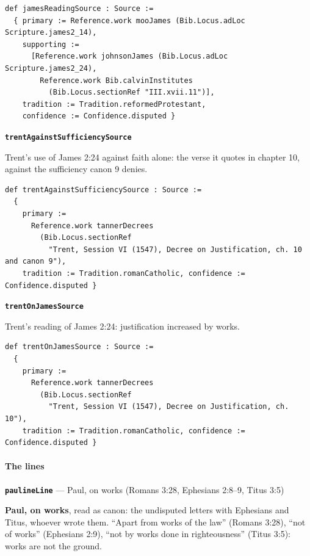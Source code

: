 \documentclass[11pt,paper=\testimonypaper,DIV=13,parskip=false]{scrartcl}
\begin{document}
{\small\begin{verbatim}
def jamesReadingSource : Source :=
  { primary := Reference.work mooJames (Bib.Locus.adLoc Scripture.james2_14),
    supporting :=
      [Reference.work johnsonJames (Bib.Locus.adLoc Scripture.james2_24),
        Reference.work Bib.calvinInstitutes
          (Bib.Locus.sectionRef "III.xvii.11")],
    tradition := Tradition.reformedProtestant,
    confidence := Confidence.disputed }
\end{verbatim}}
\par\medskip\noindent\textbf{\texttt{trent\allowbreak{}Against\allowbreak{}Sufficiency\allowbreak{}Source}}\par\nobreak\noindent
Trent’s use of James 2:24 against faith alone: the verse it quotes in chapter 10, against the sufficiency canon 9 denies.

{\small\begin{verbatim}
def trentAgainstSufficiencySource : Source :=
  {
    primary :=
      Reference.work tannerDecrees
        (Bib.Locus.sectionRef
          "Trent, Session VI (1547), Decree on Justification, ch. 10 and canon 9"),
    tradition := Tradition.romanCatholic, confidence := Confidence.disputed }
\end{verbatim}}
\par\medskip\noindent\textbf{\texttt{trent\allowbreak{}On\allowbreak{}James\allowbreak{}Source}}\par\nobreak\noindent
Trent’s reading of James 2:24: justification increased by works.

{\small\begin{verbatim}
def trentOnJamesSource : Source :=
  {
    primary :=
      Reference.work tannerDecrees
        (Bib.Locus.sectionRef
          "Trent, Session VI (1547), Decree on Justification, ch. 10"),
    tradition := Tradition.romanCatholic, confidence := Confidence.disputed }
\end{verbatim}}
\paragraph*{The lines}
\leavevmode\par\nobreak
\par\medskip\noindent\textbf{\texttt{pauline\allowbreak{}Line}} --- Paul, on works (Romans 3:28, Ephesians 2:8–9, Titus 3:5)\par\nobreak\noindent
\textbf{Paul, on works}, read as canon: the undisputed letters with Ephesians and Titus, whoever wrote them. “Apart from works of the law” (Romans 3:28), “not of works” (Ephesians 2:9), “not by works done in righteousness” (Titus 3:5): works are not the ground.
\end{document}
